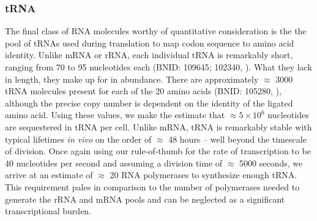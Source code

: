 \subsubsection{tRNA}
The final class of RNA molecules worthy of quantitative consideration is the the
pool of tRNAs used during translation to map codon sequence to amino acid
identity. Unlike mRNA or rRNA, each individual tRNA is remarkably short, ranging
from 70 to 95 nucleotides each (BNID: 109645; 102340, \cite{milo2010}). What
they lack in length, they make up for in abundance. There are approximately
$\approx$ 3000 tRNA molecules present for each of the 20 amino acids (BNID:
105280, \cite{milo2010}), although the precise copy number is dependent on the
identity of the ligated amino acid.  Using these values, we make the estimate
that $\approx 5 \times 10^6$ nucleotides are sequestered in tRNA per cell.
Unlike mRNA, tRNA is remarkably stable with typical lifetimes \textit{in vivo}
on the order of $\approx$ 48 hours \citep{abelson1974,svenningsen2017} -- well
beyond the timescale of division. Once again using our rule-of-thumb for the
rate of transcription to be 40 nucleotides per second and assuming a division
time of $\approx$ 5000 seconds, we arrive at an estimate of $\approx$ 20 RNA
polymerases to synthesize enough tRNA. This requirement pales in comparison to
the number of polymerases needed to generate the rRNA and mRNA pools and can be
neglected as a significant transcriptional burden.

